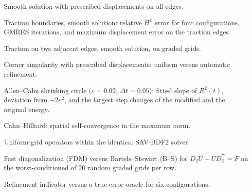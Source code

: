 \documentclass[11pt]{article}
\begin{document}
\begin{table}[htbp]\centering\small
\caption{Smooth solution with prescribed displacements on all edges.}

\end{table}

\clearpage
\begin{table}[htbp]\centering\small
\caption{Traction boundaries, smooth solution: relative $H^1$ error for four configurations, GMRES iterations, and maximum displacement error on the traction edges.}

\end{table}

\begin{table}[htbp]\centering\small
\caption{Traction on two adjacent edges, smooth solution, on graded grids.}

\end{table}

\begin{table}[htbp]\centering\small
\caption{Corner singularity with prescribed displacements: uniform versus automatic refinement.}

\end{table}

\clearpage
\begin{table}[htbp]\centering\small
\caption{Allen--Cahn shrinking circle ($\varepsilon=0.02$, $\Delta t=0.05$): fitted slope of $R^2(t)$, deviation from $-2\varepsilon^2$, and the largest step changes of the modified and the original energy.}

\end{table}

\begin{table}[htbp]\centering\small
\caption{Cahn--Hilliard: spatial self-convergence in the maximum norm.}

\end{table}

\begin{table}[htbp]\centering\small
\caption{Uniform-grid operators within the identical SAV-BDF2 solver.}

\end{table}

\clearpage
\begin{table}[htbp]\centering\small
\caption{Fast diagonalization (FDM) versus Bartels--Stewart (B--S) for $D_2U+UD_2^{\mathsf T}=F$ on the worst-conditioned of 20 random graded grids per row.}

\end{table}

\clearpage
\begin{table}[htbp]\centering\small
\caption{Refinement indicator versus a true-error oracle for six configurations.}

\end{table}
\end{document}
